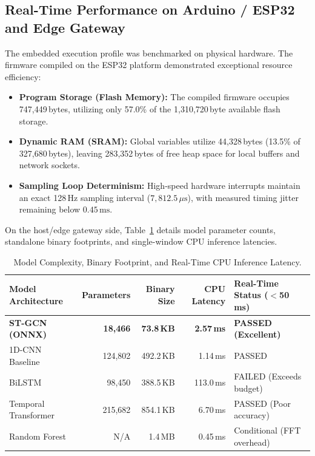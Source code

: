 \documentclass[11pt,a4paper]{article}
\begin{document}
\subsection{Real-Time Performance on Arduino / ESP32 and Edge Gateway}
The embedded execution profile was benchmarked on physical hardware. The firmware compiled on the ESP32 platform demonstrated exceptional resource efficiency:
\begin{itemize}
    \item \textbf{Program Storage (Flash Memory):} The compiled firmware occupies 747,449\,bytes, utilizing only 57.0\% of the 1,310,720\,byte available flash storage.
    \item \textbf{Dynamic RAM (SRAM):} Global variables utilize 44,328\,bytes (13.5\% of 327,680\,bytes), leaving 283,352\,bytes of free heap space for local buffers and network sockets.
    \item \textbf{Sampling Loop Determinism:} High-speed hardware interrupts maintain an exact 128\,Hz sampling interval ($7,812.5\,\mu\text{s}$), with measured timing jitter remaining below $0.45\,\text{ms}$.
\end{itemize}

On the host/edge gateway side, Table~\ref{tab:latency} details model parameter counts, standalone binary footprints, and single-window CPU inference latencies.

\begin{table}[htbp]
\centering
\caption{Model Complexity, Binary Footprint, and Real-Time CPU Inference Latency.}
\label{tab:latency}
\small
\begin{tabularx}{\textwidth}{l r r r X}
\toprule
\textbf{Model Architecture} & \textbf{Parameters} & \textbf{Binary Size} & \textbf{CPU Latency} & \textbf{Real-Time Status ($<$50\,ms)} \\
\midrule
\textbf{ST-GCN (ONNX)} & \textbf{18,466} & \textbf{73.8\,KB} & \textbf{2.57\,ms} & \textbf{PASSED (Excellent)} \\
1D-CNN Baseline & 124,802 & 492.2\,KB & 1.14\,ms & PASSED \\
BiLSTM & 98,450 & 388.5\,KB & 113.0\,ms & FAILED (Exceeds budget) \\
Temporal Transformer & 215,682 & 854.1\,KB & 6.70\,ms & PASSED (Poor accuracy) \\
Random Forest & N/A & 1.4\,MB & 0.45\,ms & Conditional (FFT overhead) \\
\bottomrule
\end{tabularx}
\end{table}
\end{document}
